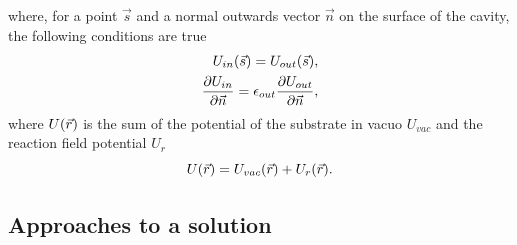 \documentclass[../master_thesis.tex]{subfiles}
\begin{document}
where, for a point $\vec{s}$ and a normal outwards vector $\vec{n}$ on the
surface of the cavity, the following conditions are true
\cite{Sorland, Tomasi:1994wt}
\begin{align}
  \begin{split}
    U_{in}(\vec{s}) = U_{out}(\vec{s}),\\
    \frac{\partial U_{in}}{\partial\vec{n}} = \epsilon_{out}\frac{\partial U_{out}}{\partial\vec{n}},
  \end{split}
\end{align}
where $U(\vec{r})$ is the sum of the potential of the substrate in vacuo
$U_{vac}$ and the reaction field potential $U_r$\cite{Sorland, FossoTande:2013ka}
\begin{equation}\label{eq:Utot}
  U(\vec{r}) = U_{vac}(\vec{r}) + U_r(\vec{r}).
\end{equation}

\subsection{Approaches to a solution}\label{approchessolv}
\end{document}
